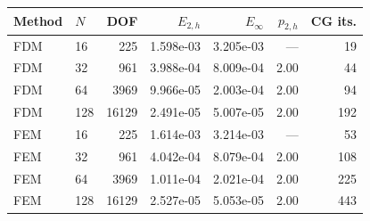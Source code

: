 \begin{tabular}{llrrrrr}
\toprule
Method & $N$ & DOF & $E_{2,h}$ & $E_\infty$ & $p_{2,h}$ & CG its.\\
\midrule
FDM & 16 & 225 & 1.598e-03 & 3.205e-03 & --- & 19\\
FDM & 32 & 961 & 3.988e-04 & 8.009e-04 & 2.00 & 44\\
FDM & 64 & 3969 & 9.966e-05 & 2.003e-04 & 2.00 & 94\\
FDM & 128 & 16129 & 2.491e-05 & 5.007e-05 & 2.00 & 192\\
FEM & 16 & 225 & 1.614e-03 & 3.214e-03 & --- & 53\\
FEM & 32 & 961 & 4.042e-04 & 8.079e-04 & 2.00 & 108\\
FEM & 64 & 3969 & 1.011e-04 & 2.021e-04 & 2.00 & 225\\
FEM & 128 & 16129 & 2.527e-05 & 5.053e-05 & 2.00 & 443\\
\bottomrule
\end{tabular}
